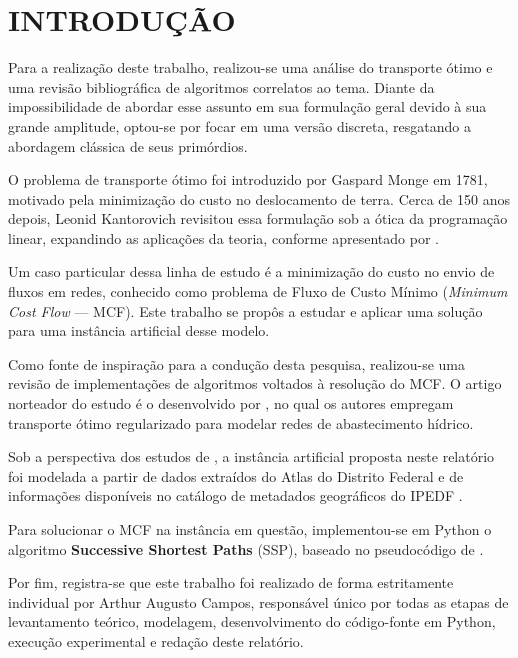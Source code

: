 \newpage
\pagestyle{fancy}
\setcounter{page}{3} %
\section{INTRODUÇÃO}

Para a realização deste trabalho, realizou-se uma análise do transporte ótimo e uma revisão bibliográfica de algoritmos correlatos ao tema. Diante da impossibilidade de abordar esse assunto em sua formulação geral devido à sua grande amplitude, optou-se por focar em uma versão discreta, resgatando a abordagem clássica de seus primórdios.

O problema de transporte ótimo foi introduzido por Gaspard Monge em 1781, motivado pela minimização do custo no deslocamento de terra. Cerca de 150 anos depois, Leonid Kantorovich revisitou essa formulação sob a ótica da programação linear, expandindo as aplicações da teoria, conforme apresentado por \textcite{figalli2021invitation}.

Um caso particular dessa linha de estudo é a minimização do custo no envio de fluxos em redes, conhecido como problema de Fluxo de Custo Mínimo (\textit{Minimum Cost Flow} --- MCF). Este trabalho se propôs a estudar e aplicar uma solução para uma instância artificial desse modelo.

Como fonte de inspiração para a condução desta pesquisa, realizou-se uma revisão de implementações de algoritmos voltados à resolução do MCF. O artigo norteador do estudo é o desenvolvido por \textcite{mascherpa2023estimating}, no qual os autores empregam transporte ótimo regularizado para modelar redes de abastecimento hídrico.

Sob a perspectiva dos estudos de \textcite{mascherpa2023estimating}, a instância artificial proposta neste relatório foi modelada a partir de dados extraídos do Atlas do Distrito Federal \parencite{atlasdf2020} e de informações disponíveis no catálogo de metadados geográficos do IPEDF \parencite{ipedfgeoserver}.

Para solucionar o MCF na instância em questão, implementou-se em Python o algoritmo \textbf{Successive Shortest Paths} (SSP), baseado no pseudocódigo de \textcite{ahuja1993network}.

Por fim, registra-se que este trabalho foi realizado de forma estritamente individual por Arthur Augusto Campos, responsável único por todas as etapas de levantamento teórico, modelagem, desenvolvimento do código-fonte em Python, execução experimental e redação deste relatório.